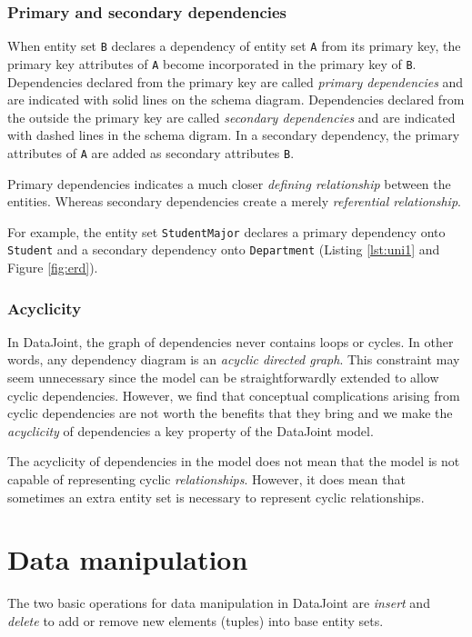 \documentclass[letter,10pt]{article}
\newcommand{\datajoint}{DataJoint\xspace}
\begin{document}
\subsubsection{Primary and secondary dependencies}
When entity set \lstinline$B$ declares a dependency of entity set \lstinline$A$ from its primary key, the primary key attributes of \lstinline$A$ become incorporated in the primary key of \lstinline$B$.  
Dependencies declared from the primary key are called \emph{primary dependencies} and are indicated with solid lines on the schema diagram. 
Dependencies declared from the outside the primary key are called \emph{secondary dependencies} and are indicated with dashed lines in the schema digram.  
In a secondary dependency, the primary attributes of \lstinline$A$ are added as secondary attributes \lstinline$B$. 

Primary dependencies indicates a much closer \emph{defining relationship} between the entities. Whereas secondary dependencies create a merely \emph{referential relationship}.

For example, the entity set \lstinline$StudentMajor$ declares a primary dependency onto \lstinline$Student$ and a secondary dependency onto \lstinline$Department$ (Listing \ref{lst:uni1} and Figure \ref{fig:erd}).


\subsubsection{Acyclicity}
In \datajoint, the graph of dependencies never contains loops or cycles.  
In other words, any dependency diagram is an \emph{acyclic directed graph}.
This constraint may seem unnecessary since the model can be straightforwardly extended to allow cyclic dependencies. 
However, we find that conceptual complications arising from cyclic dependencies are not worth the benefits that they bring and we make the \emph{acyclicity} of dependencies a key property of the \datajoint model.

The acyclicity of dependencies in the model does not mean that the model is not capable of representing cyclic \emph{relationships}. 
However, it does mean that sometimes an extra entity set is necessary to represent cyclic relationships. 

\section{Data manipulation}\label{sec:manip}
The two basic operations for data manipulation in \datajoint are \emph{insert} and \emph{delete} to add or remove new elements (tuples) into base entity sets.
\end{document}
